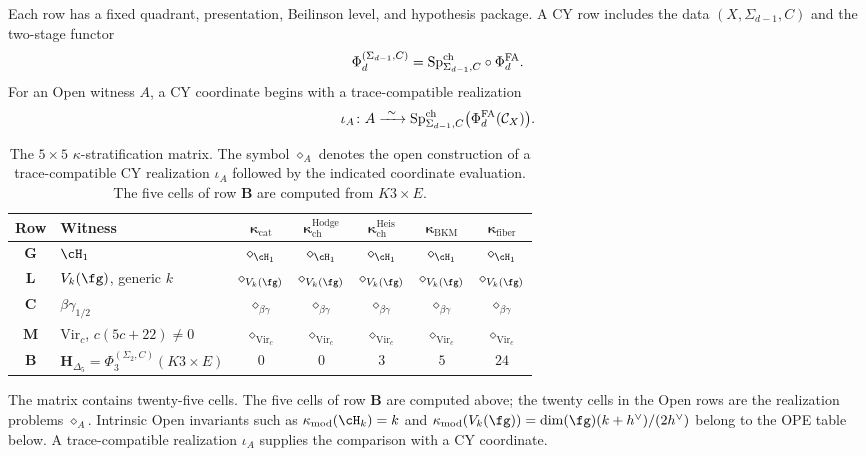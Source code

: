 \medskip

Each row has a fixed quadrant, presentation, Beilinson level, and
hypothesis package.  A CY row includes the data
\((X,\Sigma_{d-1},C)\) and the two-stage functor
\[
\Phi_d^{(\Sigma_{d-1},C)}
=\mathrm{Sp}^{\mathrm{ch}}_{\Sigma_{d-1},C}\circ\Phi^{\mathrm{FA}}_d.
\]
For an Open witness \(A\), a CY coordinate begins with a
trace-compatible realization
\[
\iota_A\colon
A\xrightarrow{\ \sim\ }
\mathrm{Sp}^{\mathrm{ch}}_{\Sigma_{d-1},C}
\bigl(\Phi^{\mathrm{FA}}_d(\mathcal C_X)\bigr).
\]

\begin{table}[ht]
\centering
\caption{The $5\times 5$ $\kappa$-stratification matrix.
The symbol \(\diamond_A\) denotes the open construction of a
trace-compatible CY realization \(\iota_A\) followed by the indicated
coordinate evaluation.  The five cells of row \(\mathbf B\) are
computed from \(K3\times E\).}
\label{tab:five-by-five-kappa-stratification}
\renewcommand{\arraystretch}{1.4}
{\small
\begin{tabular}{|c|l|c|c|c|c|c|}
\hline
\textbf{Row} & \textbf{Witness}
 & $\boldsymbol{\kappa_{\mathrm{cat}}}$
 & $\boldsymbol{\kappa^{\mathrm{Hodge}}_{\mathrm{ch}}}$
 & $\boldsymbol{\kappa^{\mathrm{Heis}}_{\mathrm{ch}}}$
 & $\boldsymbol{\kappa_{\mathrm{BKM}}}$
 & $\boldsymbol{\kappa_{\mathrm{fiber}}}$ \\
\hline
$\mathbf G$ & $\cH_1$ & \(\diamond_{\cH_1}\) &
\(\diamond_{\cH_1}\) & \(\diamond_{\cH_1}\) &
\(\diamond_{\cH_1}\) & \(\diamond_{\cH_1}\) \\
\hline
$\mathbf L$ & $V_k(\fg)$, generic $k$ & \(\diamond_{V_k(\fg)}\) &
\(\diamond_{V_k(\fg)}\) & \(\diamond_{V_k(\fg)}\) &
\(\diamond_{V_k(\fg)}\) & \(\diamond_{V_k(\fg)}\) \\
\hline
$\mathbf C$ & $\beta\gamma_{1/2}$ & \(\diamond_{\beta\gamma}\) &
\(\diamond_{\beta\gamma}\) & \(\diamond_{\beta\gamma}\) &
\(\diamond_{\beta\gamma}\) & \(\diamond_{\beta\gamma}\) \\
\hline
$\mathbf M$ & $\mathrm{Vir}_c$, $c(5c+22)\ne0$ &
\(\diamond_{\mathrm{Vir}_c}\) & \(\diamond_{\mathrm{Vir}_c}\) &
\(\diamond_{\mathrm{Vir}_c}\) & \(\diamond_{\mathrm{Vir}_c}\) &
\(\diamond_{\mathrm{Vir}_c}\) \\
\hline
$\mathbf B$ &
$\mathbf H_{\Delta_5}
=\Phi_3^{(\Sigma_2,C)}(K3\times E)$
 & $0$ & $0$ & $3$ & $5$ & $24$ \\
\hline
\end{tabular}}
\end{table}

The matrix contains twenty-five cells.  The five cells of row
\(\mathbf B\) are computed above; the twenty cells in the Open rows
are the realization problems \(\diamond_A\).  Intrinsic Open
invariants such as
\(\kappa_{\mathrm{mod}}(\cH_k)=k\) and
\(\kappa_{\mathrm{mod}}(V_k(\fg))
=\dim(\fg)(k+h^\vee)/(2h^\vee)\)
belong to the OPE table below.  A trace-compatible realization
\(\iota_A\) supplies the comparison with a CY coordinate.

